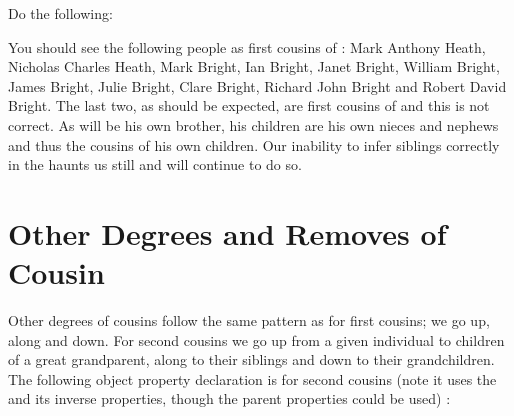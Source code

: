 Do the following:

You should see the following people as first cousins of \rds: Mark Anthony Heath, Nicholas Charles Heath, Mark Bright, Ian Bright, Janet Bright, William Bright, James Bright, Julie Bright, Clare Bright, Richard John Bright and Robert David Bright. The last two, as should be expected, are first cousins of \rds and this is not correct. As \ds will be his own brother, his children are his own nieces and nephews and thus the cousins of his own children. Our inability to infer siblings correctly in the \fhkb haunts us still and will continue to do so.


\section{Other Degrees and Removes of Cousin}

Other degrees of cousins follow the same pattern as for first cousins; we go up, along and down. For second cousins we go up from a given individual to children of a great grandparent, along to their siblings and down to their grandchildren. The following object property declaration is for second cousins (note it uses the  and its inverse properties, though the parent properties could be used) :


